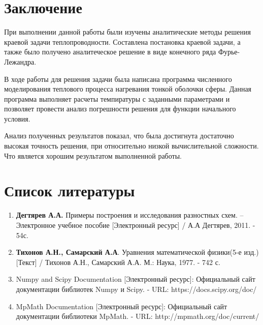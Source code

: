 {\newpage
{}
{}


\section*{Заключение}
{
    При выполнении данной работы были изучены аналитические методы решения краевой задачи теплопроводности. Составлена постановка краевой задачи, а также было получено аналитеческое решение в виде конечного ряда Фурье-Лежандра.
    
    
    В ходе работы для решения задачи была написана программа численного моделирования теплового процесса нагревания тонкой оболочки сферы. Данная программа выполняет расчеты темпиратуры с заданными параметрами и позволяет провести анализ погрешности решения для функции начального условия.
     
     
     Анализ полученных результатов показал, что была достигнута достаточно высокая точность решения, при относительно низкой вычислительной сложности.
     Что является хорошим результатом выполненной работы. 
    
}

\newpage
{}
{}


\section*{Список литературы}
{
	\begin{enumerate}
	\item \textbf{Дегтярев А.А.} Примеры построения и исследования разностных схем. – Электронное учебное пособие [Электронный ресурс]  / А.А Дегтярев, 2011. - 54с.\label{src1}
    \item \textbf{Тихонов А.Н., Самарский А.А}. Уравнения математической физики(5-е изд.) [Текст]
    / Тихонов А.Н., Самарский А.А. М.: Наука, 1977. - 742 с.\label{src2}
    	\item {Numpy and Scipy Documentation [Электронный ресурс]: Официальный сайт документации библиотек Numpy и Scipy. - URL: https://docs.scipy.org/doc/}\label{src3}
    	\item {MpMath Documentation [Электронный ресурс]: Официальный сайт документации библиотеки MpMath. - URL: http://mpmath.org/doc/current/}\label{src4}
	\end{enumerate}
}

}
